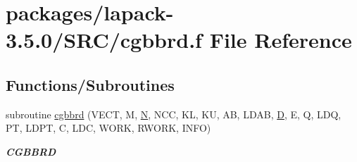 \hypertarget{cgbbrd_8f}{}\section{packages/lapack-\/3.5.0/\+S\+R\+C/cgbbrd.f File Reference}
\label{cgbbrd_8f}
\subsection*{Functions/\+Subroutines}
\begin{DoxyCompactItemize}
\item 
subroutine \hyperlink{group__complexGBcomputational_ga21ccf4ff5931f5c90faf259afea49ad0}{cgbbrd} (V\+E\+C\+T, M, \hyperlink{polmisc_8c_a0240ac851181b84ac374872dc5434ee4}{N}, N\+C\+C, K\+L, K\+U, A\+B, L\+D\+A\+B, \hyperlink{odrpack_8h_a7dae6ea403d00f3687f24a874e67d139}{D}, E, Q, L\+D\+Q, P\+T, L\+D\+P\+T, C, L\+D\+C, W\+O\+R\+K, R\+W\+O\+R\+K, I\+N\+F\+O)
\begin{DoxyCompactList}\small\item\em {\bfseries C\+G\+B\+B\+R\+D} \end{DoxyCompactList}\end{DoxyCompactItemize}
